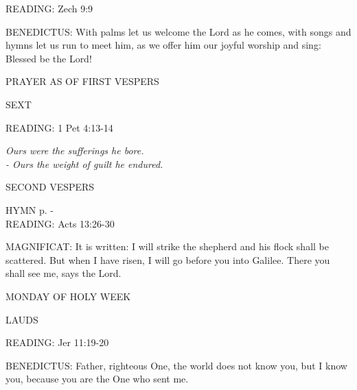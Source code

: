 \noindent\small{\uppercase{READING:}}    Zech 9:9 \textbf{   \\}

\noindent\small{\uppercase{BENEDICTUS:}}	With palms let us welcome the Lord as he comes, with songs and hymns let us run to meet him, as we offer him our joyful worship and sing: Blessed be the Lord!\\

\begin{flushleft}\normalsize{\uppercase{PRAYER as of FIRST VESPERS\\}}\end{flushleft}

\begin{flushleft}\normalsize{\uppercase{SEXT\\}}\end{flushleft}
\noindent\small{\uppercase{READING:}}    1 Pet 4:13-14 \textbf{   \\}
\begin{center}
\textit{Ours were the sufferings he bore.\\
- Ours the weight of guilt he endured.}\end{center}

\begin{flushleft}\normalsize{\uppercase{SECOND VESPERS\\}}\end{flushleft}
\small{\uppercase{HYMN} p. \pageref{lent:firstHymn}-\pageref{lent:lastHymn}\\}
\noindent\small{\uppercase{READING:}}    Acts 13:26-30 \textbf{   \\}

\noindent\small{\uppercase{MAGNIFICAT:}}	It is written: I will strike the shepherd and his flock shall be scattered. But when I have risen, I will go before you into Galilee. There you shall see me, says the Lord.\\

	\begin{center}
\normalsize MONDAY OF HOLY WEEK
	\end{center}

\begin{flushleft}\normalsize{\uppercase{LAUDS\\}}\end{flushleft}
\noindent\small{\uppercase{READING:}}    Jer 11:19-20 \textbf{   \\}

\noindent\small{\uppercase{BENEDICTUS:}}	Father, righteous One, the world does not know you, but I know you, because you are the One who sent me.\\

